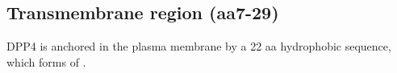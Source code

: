 \subsection{Transmembrane region (aa7-29)}

DPP4 is anchored in the plasma membrane by a 22 aa hydrophobic sequence, which forms of \alpha. \cite{Hong_1990}